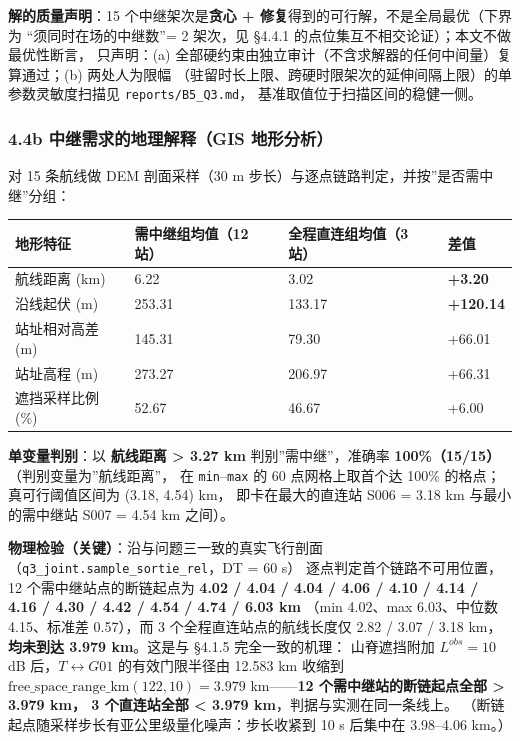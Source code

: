 \documentclass[
  10.5pt,
]{extarticle}
\newcounter{none} %
\begin{document}
\textbf{解的质量声明}：15 个中继架次是\textbf{贪心 +
修复}得到的可行解，不是全局最优（下界为 ``须同时在场的中继数''= 2
架次，见 §4.4.1 的点位集互不相交论证）；本文不做最优性断言， 只声明：(a)
全部硬约束由独立审计（不含求解器的任何中间量）复算通过；(b) 两处人为限幅
（驻留时长上限、跨硬时限架次的延伸间隔上限）的单参数灵敏度扫描见
\texttt{reports/B5\_Q3.md}， 基准取值位于扫描区间的稳健一侧。

\subsubsection{4.4b 中继需求的地理解释（GIS
地形分析）}\label{b-ux4e2dux7ee7ux9700ux6c42ux7684ux5730ux7406ux89e3ux91cagis-ux5730ux5f62ux5206ux6790}

对 15 条航线做 DEM 剖面采样（30 m
步长）与逐点链路判定，并按''是否需中继''分组：

{\def\LTcaptype{none} %
\begin{longtable}[]{@{}llll@{}}
\toprule\noalign{}
地形特征 & 需中继组均值（12 站） & 全程直连组均值（3 站） & 差值 \\
\midrule\noalign{}
\endhead
\bottomrule\noalign{}
\endlastfoot
航线距离 (km) & 6.22 & 3.02 & \textbf{+3.20} \\
沿线起伏 (m) & 253.31 & 133.17 & \textbf{+120.14} \\
站址相对高差 (m) & 145.31 & 79.30 & +66.01 \\
站址高程 (m) & 273.27 & 206.97 & +66.31 \\
遮挡采样比例 (\%) & 52.67 & 46.67 & +6.00 \\
\end{longtable}
}

\textbf{单变量判别}：以 \textbf{航线距离 \textgreater{} 3.27 km}
判别''需中继''，准确率 \textbf{100\%（15/15）}（判别变量为''航线距离''，
在 \texttt{min}--\texttt{max} 的 60 点网格上取首个达 100\%
的格点；真可行阈值区间为 (3.18, 4.54) km， 即卡在最大的直连站 S006 =
3.18 km 与最小的需中继站 S007 = 4.54 km 之间）。

\textbf{物理检验（关键）}：沿与问题三一致的真实飞行剖面（\texttt{q3\_joint.sample\_sortie\_rel}，DT
= 60 s） 逐点判定首个链路不可用位置，12 个需中继站点的断链起点为
\textbf{4.02 / 4.04 / 4.04 / 4.06 / 4.10 / 4.14 / 4.16 / 4.30 / 4.42 /
4.54 / 4.74 / 6.03 km} （min 4.02、max 6.03、中位数 4.15、标准差
0.57），而 3 个全程直连站点的航线长度仅 2.82 / 3.07 / 3.18
km，\textbf{均未到达 3.979 km}。这是与 §4.1.5 完全一致的机理：
山脊遮挡附加 \(L^{obs}=10\) dB 后，\(T\leftrightarrow G01\)
的有效门限半径由 12.583 km 收缩到
\(\text{free\_space\_range\_km}(122, 10)=3.979\) km------\textbf{12
个需中继站的断链起点全部 \textgreater{} 3.979 km， 3 个直连站全部
\textless{} 3.979 km}，判据与实测在同一条线上。
（断链起点随采样步长有亚公里级量化噪声：步长收紧到 10 s 后集中在
3.98--4.06 km。）
\end{document}
